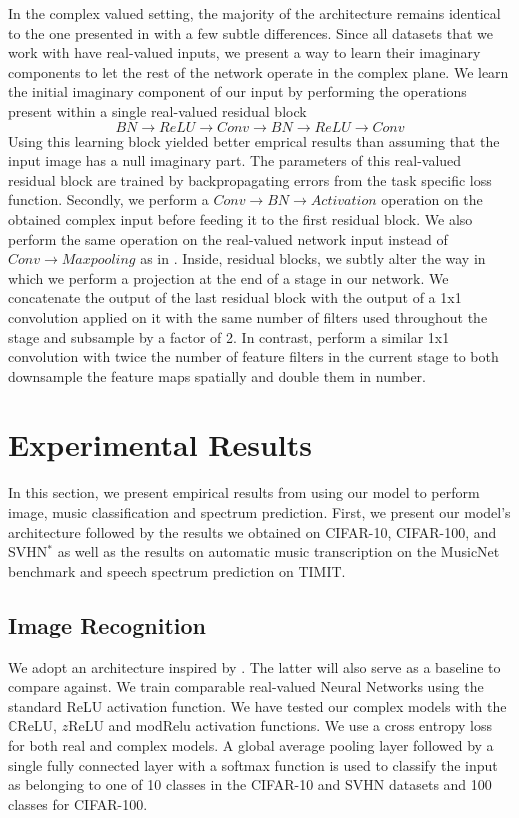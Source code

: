 \documentclass{article}
\begin{document}
In the complex valued setting, the majority of the architecture remains identical to the one presented in \cite{he2016identity} with a few subtle differences. 
Since all datasets that we work with have real-valued inputs, we present a way to learn their imaginary components to let the rest of the network operate in the complex plane. We learn the initial imaginary component of our input by performing the operations present within a single real-valued residual block
$$BN \rightarrow ReLU \rightarrow Conv \rightarrow BN \rightarrow ReLU \rightarrow Conv $$ Using this learning block yielded better emprical results than assuming that the input image has a null imaginary part. The parameters of this real-valued residual block are trained by backpropagating errors from the task specific loss function. Secondly, we perform a $Conv \rightarrow BN \rightarrow Activation$ operation on the obtained complex input before feeding it to the first residual block. We also perform the same operation on the real-valued network input instead of $Conv \rightarrow Max pooling$ as in \citet{he2016identity}. Inside, residual blocks, we subtly alter the way in which we perform a projection at the end of a stage in our network. We concatenate the output of the last residual block with the output of a 1x1 convolution applied on it with the same number of filters used throughout the stage and subsample by a factor of 2. In contrast, \citet{he2016identity} perform a similar 1x1 convolution with twice the number of feature filters in the current stage to both downsample the feature maps spatially and double them in number.

\section{Experimental Results}
In this section, we present empirical results from using our model to perform image, music classification and spectrum prediction. First, we present our model's architecture followed by the results we obtained on CIFAR-10, CIFAR-100, and SVHN$^{*}$ as well as the results on automatic music transcription on the MusicNet benchmark and speech spectrum prediction on TIMIT.

\subsection{Image Recognition}
\label{arch_train}

We adopt an architecture inspired by \cite{he2016identity}. The latter will also serve as a baseline to compare against. We train comparable real-valued Neural Networks using the standard ReLU activation function. We have tested our complex models with the $\mathbb{C}$ReLU, $z$ReLU and modRelu activation functions. We use a cross entropy loss for both real and complex models. A global average pooling layer followed by a single fully connected layer with a softmax function is used to classify the input as belonging to one of 10 classes in the CIFAR-10 and SVHN datasets and 100 classes for CIFAR-100.
\end{document}
